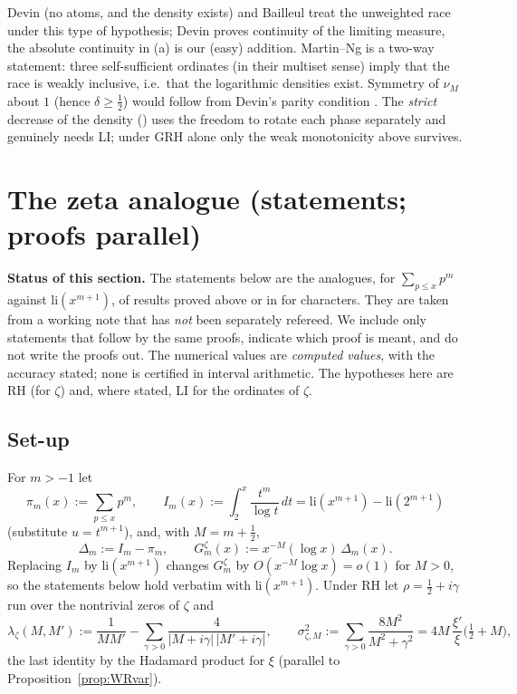 \documentclass[11pt]{amsart}
\theoremstyle{definition}
\numberwithin{equation}{section}
\begin{document}
Devin \cite[Theorem~2.2]{Dev20} (no atoms, and the density exists)
and Bailleul \cite[Theorem~1.7]{Bai21} treat the unweighted race
under this type of hypothesis; Devin proves continuity of the
limiting measure, the absolute continuity in (a) is our (easy)
addition. Martin--Ng \cite[Theorem~1.5(a)]{MN20} is a two-way
statement: three self-sufficient ordinates (in their multiset sense)
imply that the race is weakly inclusive, i.e.\ that the logarithmic
densities exist. Symmetry of $\nu_M$ about $1$ (hence
$\delta\ge\tfrac12$) would follow from Devin's parity condition
\cite[Theorem~2.3]{Dev20}. The \emph{strict} decrease of the density
(\cite[the coupling monotonicity theorem]{MC}) uses the freedom to rotate each phase
separately and genuinely needs LI; under GRH alone only the weak
monotonicity above survives.

\section{The zeta analogue (statements; proofs parallel)}
\label{sec:zeta}

\noindent\textbf{Status of this section.} The statements below are
the analogues, for $\sum_{p\le x}p^m$ against
$\mathrm{li}(x^{m+1})$, of results proved above or in \cite{MC} for
characters. They are taken from a working note that has \emph{not}
been separately refereed. We include only statements that follow by
the same proofs, indicate which proof is meant, and do not write the
proofs out. The numerical values are \emph{computed values}, with the
accuracy stated; none is certified in interval arithmetic. The
hypotheses here are RH (for $\zeta$) and, where stated, LI for the
ordinates of $\zeta$.

\subsection{Set-up}
For $m>-1$ let
\[
\pi_m(x):=\sum_{p\le x}p^m,\qquad
I_m(x):=\int_2^x\frac{t^m}{\log t}\,dt
=\mathrm{li}(x^{m+1})-\mathrm{li}(2^{m+1})
\]
(substitute $u=t^{m+1}$), and, with $M=m+\tfrac12$,
\[
\Delta_m:=I_m-\pi_m,\qquad
G^\zeta_m(x):=x^{-M}(\log x)\,\Delta_m(x).
\]
Replacing $I_m$ by $\mathrm{li}(x^{m+1})$ changes $G^\zeta_m$ by
$O(x^{-M}\log x)=o(1)$ for $M>0$, so the statements below hold
verbatim with $\mathrm{li}(x^{m+1})$. Under RH let
$\rho=\tfrac12+i\gamma$ run over the nontrivial zeros of $\zeta$ and
\[
\lambda_\zeta(M,M'):=\frac1{MM'}
-\sum_{\gamma>0}\frac4{|M+i\gamma|\,|M'+i\gamma|},
\qquad
\sigma_{\zeta,M}^2:=\sum_{\gamma>0}\frac{8M^2}{M^2+\gamma^2}
=4M\,\frac{\xi'}{\xi}\bigl(\tfrac12+M\bigr),
\]
the last identity by the Hadamard product for $\xi$ (parallel to
Proposition~\ref{prop:WRvar}).
\end{document}

